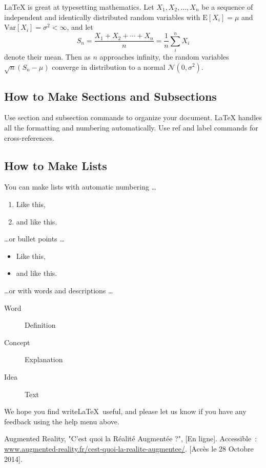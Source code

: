 \documentclass[a4paper]{article}
\begin{document}
\LaTeX{} is great at typesetting mathematics. Let $X_1, X_2, \ldots, X_n$ be a sequence of independent and identically distributed random variables with $\text{E}[X_i] = \mu$ and $\text{Var}[X_i] = \sigma^2 < \infty$, and let
$$S_n = \frac{X_1 + X_2 + \cdots + X_n}{n}
      = \frac{1}{n}\sum_{i}^{n} X_i$$
denote their mean. Then as $n$ approaches infinity, the random variables $\sqrt{n}(S_n - \mu)$ converge in distribution to a normal $\mathcal{N}(0, \sigma^2)$.

\subsection{How to Make Sections and Subsections}

Use section and subsection commands to organize your document. \LaTeX{} handles all the formatting and numbering automatically. Use ref and label commands for cross-references.

\subsection{How to Make Lists}

You can make lists with automatic numbering \dots

\begin{enumerate}
\item Like this,
\item and like this.
\end{enumerate}
\dots or bullet points \dots
\begin{itemize}
\item Like this,
\item and like this.
\end{itemize}
\dots or with words and descriptions \dots
\begin{description}
\item[Word] Definition
\item[Concept] Explanation
\item[Idea] Text
\end{description}

We hope you find write\LaTeX\ useful, and please let us know if you have any feedback using the help menu above.


\begin{thebibliography}{1}
	 Augmented Reality, "C'est quoi la Réalité Augmentée ?", [En ligne]. Accessible~: \url{www.augmented-reality.fr/cest-quoi-la-realite-augmentee/}. [Accès le 28 Octobre 2014].
\end{thebibliography}

\end{document}
